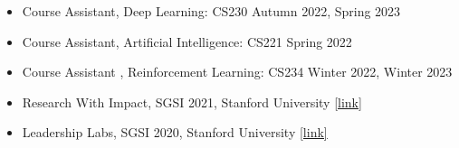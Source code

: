 \begin{itemize}
        \item Course Assistant, Deep Learning: CS230 Autumn 2022, Spring 2023
        \item Course Assistant, Artificial Intelligence: CS221 Spring 2022
        \item Course Assistant , Reinforcement Learning: CS234 Winter 2022, Winter 2023
        \item Research With Impact, SGSI 2021, Stanford University \href{https://vpge.stanford.edu/interdisciplinary-learning/sgsi/2021}{[link]}
        \item Leadership Labs, SGSI 2020, Stanford University \href{https://vpge.stanford.edu/interdisciplinary-learning/sgsi/2020}{[link]}
\end{itemize}

\par

